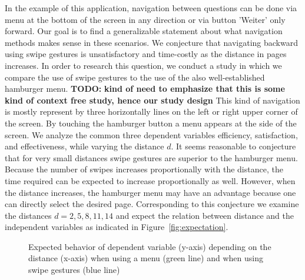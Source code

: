 \documentclass{sig-alternate-05-2015}
\newcommand{\todo}{\textbf{TODO:} \textbf}
\begin{document}
In the example of this application, navigation between questions can be done via menu at the bottom of the screen in any direction or via button 'Weiter' only forward. 
Our goal is to find a generalizable statement about what navigation methods makes sense in these scenarios. 
We conjecture that navigating backward using swipe gestures is unsatisfactory and time-costly as the distance in pages increases. 
In order to research this question, we conduct a study in which we compare the use of swipe gestures to the use of the also well-established hamburger menu. 
\todo{kind of need to emphasize that this is some kind of context free study, hence our study design} 
This kind of navigation is mostly represent by three horizontally lines on the left or right upper corner of the screen. 
By touching the hamburger button a menu appears at the side of the screen.
We analyze the common three dependent variables efficiency, satisfaction, and effectiveness, while varying the distance $d$.
It seems reasonable to conjecture
that for very small distances swipe gestures are superior to the hamburger
menu. Because the number of swipes increases proportionally with the distance, the time required can be expected to increase 
proportionally as well. However, when the distance increases, the hamburger menu
may have an advantage because one can directly select the desired page. Corresponding to this conjecture we examine the distances $d = 2, 5, 8, 11, 14$ and
expect the relation between distance and the independent variables as indicated in Figure~\ref{fig:expectation}.
\begin{figure}
	\caption{Expected behavior of dependent variable (y-axis) depending on the distance (x-axis) when using a menu (green line) and when using swipe gestures (blue line)}
\end{figure}
\end{document}
